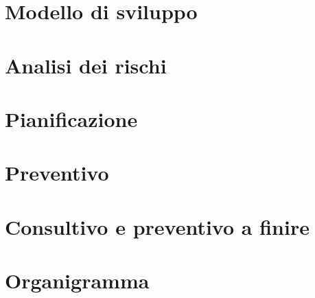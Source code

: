 \documentclass[a4paper, 12pt]{article}
\begin{document}
        \section{Modello di sviluppo}
        
    \newpage
        \section{Analisi dei rischi}
        
    \newpage
        \section{Pianificazione}
        
    \newpage
        \section{Preventivo}
        
    \newpage
        \section{Consultivo e preventivo a finire}
        
    \appendix
    \newpage
        \section{Organigramma}
        
        
\end{document}
